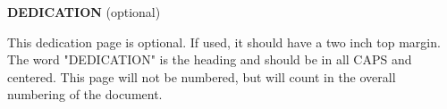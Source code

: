 \thispagestyle{empty}

\begin{center}
\textbf{DEDICATION} (optional)
\end{center}

\smallskip

This dedication page is optional. If used, it should have a two inch top margin.
The word "DEDICATION" is the heading and should be in all CAPS and centered. This
page will not be numbered, but will count in the overall numbering of the document.
